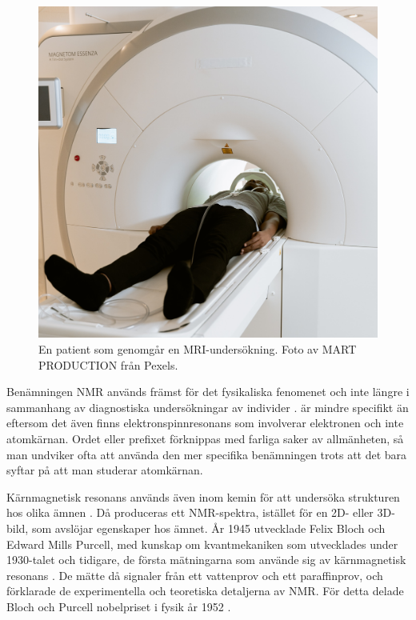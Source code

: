\documentclass[11pt, a4paper]{article}
\begin{document}
\begin{figure}[ht]
	\centering
	\includegraphics[width=.75\textwidth]{mri_patient}
	\caption{En patient som genomgår en MRI-undersökning. Foto av MART PRODUCTION \parencite*{fig:mri_patient} från Pexels.}
	\label{fig:mri_patient}
\end{figure}

Benämningen NMR används främst för det fysikaliska fenomenet och inte längre i sammanhang av diagnostiska undersökningar av individer \parencite{nmr_eller_mri}.  är mindre specifikt än  eftersom det även finns elektronspinnresonans som involverar elektronen och inte atomkärnan. Ordet  eller prefixet  förknippas med farliga saker av allmänheten, så man undviker ofta att använda den mer specifika benämningen trots att det bara syftar på att man studerar atomkärnan.

Kärnmagnetisk resonans används även inom kemin för att undersöka strukturen hos olika ämnen \parencite{nmr_kemi}. Då produceras ett NMR-spektra, istället för en 2D- eller 3D-bild, som avslöjar egenskaper hos ämnet. År 1945 utvecklade Felix Bloch och Edward Mills Purcell, med kunskap om kvantmekaniken som utvecklades under 1930-talet och tidigare, de första mätningarna som använde sig av kärnmagnetisk resonans \parencite{mri_lärobok}. De mätte då signaler från ett vattenprov och ett paraffinprov, och förklarade de experimentella och teoretiska detaljerna av NMR. För detta delade Bloch och Purcell nobelpriset i fysik år 1952 \parencite{nmr_nobelpris}.
\end{document}
